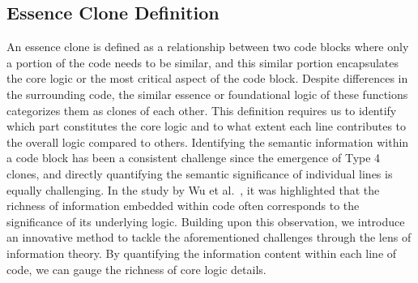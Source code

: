 

\subsection{Essence Clone Definition}\label{sec:essence_def}
An essence clone is defined as a relationship between two code blocks where only a portion of the code needs to be similar, and this similar portion encapsulates the core logic or the most critical aspect of the code block.
Despite differences in the surrounding code, the similar essence or foundational logic of these functions categorizes them as clones of each other. 
This definition requires us to identify which part constitutes the core logic and to what extent each line contributes to the overall logic compared to others. 
Identifying the semantic information within a code block has been a consistent challenge since the emergence of Type 4 clones, and directly quantifying the semantic significance of individual lines is equally challenging. 
In the study by Wu et al.~\cite{ossfp}, it was highlighted that the richness of information embedded within code often corresponds to the significance of its underlying logic. 
Building upon this observation, we introduce an innovative method to tackle the aforementioned challenges through the lens of information theory.
By quantifying the information content within each line of code, we can gauge the richness of core logic details.

